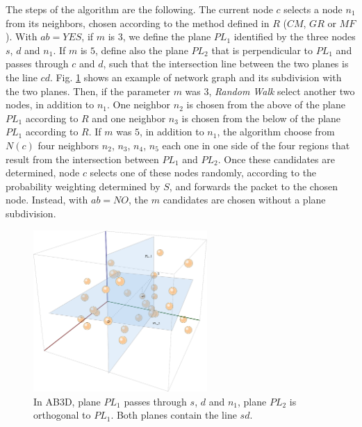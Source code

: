 \documentclass[journal,comsoc]{IEEEtran}
\begin{document}
The steps of the algorithm are the following. The current node \(c\) selects a node \(n_1\) from its neighbors, chosen according to the method defined in \(R\) (\(CM\), \(GR\) or \(MF\)). With \(ab = YES\), if \(m\) is \(3\), we define the plane \(PL_1\) identified by the three nodes \(s\), \(d\) and \(n_1\). If \(m\) is \(5\), define also the plane \(PL_2\) that is perpendicular to \(PL_1\) and passes through \(c\) and \(d\), such that the intersection line between the two planes is the line \(cd\). Fig. \ref{fig:ab3d} shows an example of network graph and its subdivision with the two planes.
Then, if the parameter \(m\) was \(3\), \emph{Random Walk} select another two nodes, in addition to \(n_1\). One neighbor \(n_2\) is chosen from the above of the plane \(PL_1\) according to \(R\) and one neighbor \(n_3\) is chosen from the below of the plane \(PL_1\) according to \(R\). If \(m\) was \(5\), in addition to \(n_1\), the algorithm choose from \(N(c)\) four neighbors \(n_2\), \(n_3\), \(n_4\), \(n_5\) each one in one side of the four regions that result from the intersection between \(PL_1\) and \(PL_2\). Once these candidates are determined, node \(c\) selects one of these nodes randomly, according to the probability weighting determined by \(S\), and forwards the packet to the chosen node.
Instead, with \(ab = NO\), the \(m\) candidates are chosen without a plane subdivision.

\begin{figure}[!t]
\centering
\includegraphics[width=2.6in]{images/ab3d}
\caption{In AB3D, plane \(PL_1\) passes through \(s\), \(d\) and \(n_1\), plane \(PL_2\) is orthogonal to \(PL_1\). Both planes contain the line \(sd\).}
  \label{fig:ab3d}
\end{figure}
\end{document}
